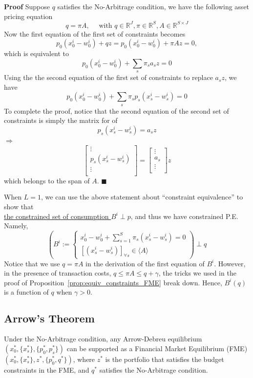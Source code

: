 \noindent \textbf{Proof}
Suppose $q$ satisfies the No-Arbitrage condition, we have the following asset pricing equation
\[
q = \pi A, \quad \text{ with } q \in  \mathbb{R}^{J}, \pi \in  \mathbb{R}^{S}, A \in \mathbb{R}^{S \times J}
\]
Now the first equation of the first set of constraints becomes
\[
p_0 (x_0^i - w_0^i) + q z = p_0 (x_0^i - w_0^i) + \pi A z = 0,
\]
which is equivalent to 
\[
p_0 (x_0^i - w_0^i) + \sum_s \pi_s a_s z  = 0
\]
Using the the second equation of the first set of constraints to replace $a_s z$, we have 
\[
p_0 (x_0^i - w_0^i) + \sum_s \pi_s p_s(x_s^i - w_s^i)  = 0
\]
To complete the proof, notice that the second equation of the second set of constraints is simply the matrix for of 
\[
p_s (x_s^i - w_s^i) = a_s z
\]
\noindent $\Rightarrow$
\[
    \begin{bmatrix} 
      \vdots \\
      p_s (x_s^i - w_s^i) \\
      \vdots \\
    \end{bmatrix} = 
        \begin{bmatrix} 
      \vdots \\
      a_s \\
      \vdots \\
    \end{bmatrix} z
\]
which belongs to the span of $A$. \(\blacksquare\)

\begin{tcolorbox}
  When $L = 1$, we can use the above statement about ``constraint equivalence'' to show that 
  \\
  \underline{the constrained set of consumption $B^i \perp p$}, and thus we have constrained P.E. 
  Namely, 
  \[
  \left(B^i := \begin{cases}
    x^i_0 - w^i_0 + \sum_{s=1}^{S} \pi_s (x^i_s - w^i_s) = 0 \\
    [(x^i_s - w^i_s)]_{\forall s} \in \langle A \rangle
  \end{cases}
  \right)
  \perp q
  \]
  Notice that we use $q = \pi A$ in the derivation of the first equation of $B^i$.
  However, in the presence of transaction costs, $q \leq \pi A \leq q + \gamma$, 
  the tricks we used in the proof of Proposition~\ref{prop:equiv_constraints_FME} break down. 
  Hence, $B^i(q)$ is a function of $q$ when $\gamma > 0$.
\end{tcolorbox}


\subsection{Arrow's Theorem}
\begin{theorem}
  Under the No-Arbitrage condition, 
  any Arrow-Debreu equilibrium $(x_0^*, \{x_s^*\}, \{p_0^*, p_s^* \})$ 
  can be supported as a Financial Market Equilibrium (FME) $(x_0^*, \{x_s^*\}, z^*, \{p_0^*, q^* \})$,
  where $z^*$ is the portfolio that satisfies the budget constraints in the FME, 
  and $q^*$ satisfies the No-Arbitrage condition.
\end{theorem}

